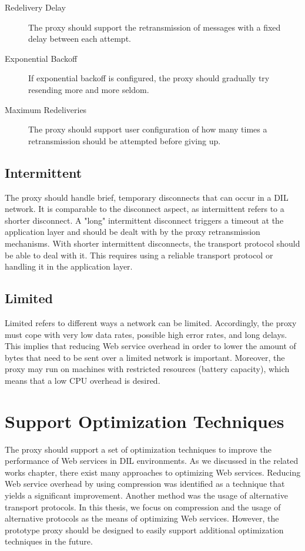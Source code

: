 \begin{description}

    \item[Redelivery Delay] The proxy should support the retransmission of
    messages with a fixed delay between each attempt.

    \item[Exponential Backoff] If exponential backoff is configured, the proxy
    should gradually try resending more and more seldom.

    \item[Maximum Redeliveries] The proxy should support user configuration of
    how many times a retransmission should be attempted before giving up.

\end{description}


\subsection{Intermittent}

The proxy should handle brief, temporary disconnects that can occur in a DIL
network. It is comparable to the disconnect aspect, as intermittent refers to a
shorter disconnect. A "long" intermittent disconnect triggers a timeout at the
application layer and should be dealt with by the proxy retransmission
mechanisms. With shorter intermittent disconnects, the transport protocol should
be able to deal with it. This requires using a reliable transport protocol or
handling it in the application layer.

\subsection{Limited}

Limited refers to different ways a network can be limited. Accordingly, the
proxy must cope with very low data rates, possible high error rates, and long
delays. This implies that reducing Web service overhead in order to lower the
amount of bytes that need to be sent over a limited network is important.
Moreover, the proxy may run on machines with restricted resources (battery
capacity), which means that a low CPU overhead is desired.

\section{Support Optimization Techniques}

The proxy should support a set of optimization techniques to improve the
performance of Web services in DIL environments. As we discussed in the related
works chapter, there exist many approaches to optimizing Web services. Reducing
Web service overhead by using compression was identified as a technique that
yields a significant improvement. Another method was the usage of alternative
transport protocols. In this thesis, we focus on compression and the usage of
alternative protocols as the means of optimizing Web services. However, the
prototype proxy should be designed to easily support additional optimization
techniques in the future.

